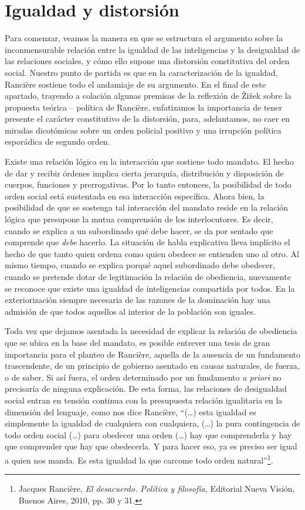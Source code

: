 \section{Igualdad y distorsión}

Para comenzar, veamos la manera en que se estructura el argumento sobre la inconmensurable relación entre la igualdad de las inteligencias y la desigualdad de las relaciones sociales, y cómo ello supone una distorsión constitutiva del orden social. Nuestro punto de partida es que en la caracterización de la igualdad, Rancière sostiene todo el andamiaje de su argumento. En el final de este apartado, trayendo a colación algunas premisas de la reflexión de Žižek sobre la propuesta teórica -- política de Rancière, enfatizamos la importancia de tener presente el carácter constitutivo de la distorsión, para, adelantamos, no caer en miradas dicotómicas sobre un orden policial positivo y una irrupción política esporádica de segundo orden.

Existe una relación lógica en la interacción que sostiene todo mandato. El hecho de dar y recibir órdenes implica cierta jerarquía, distribución y disposición de cuerpos, funciones y prerrogativas. Por lo tanto entonces, la posibilidad de todo orden social está sustentada en esa interacción específica. Ahora bien, la posibilidad de que se sostenga tal interacción del mandato reside en la relación lógica que presupone la mutua comprensión de los interlocutores. Es decir, cuando se explica a un subordinado qué debe hacer, se da por sentado que comprende que \emph{debe} hacerlo. La situación de habla explicativa lleva implícito el hecho de que tanto quien ordena como quien obedece se entienden uno al otro. Al mismo tiempo, cuando se explica porqué aquel subordinado debe obedecer, cuando se pretende dotar de legitimación la relación de obediencia, nuevamente se reconoce que existe una igualdad de inteligencias compartida por todos. En la exteriorización siempre necesaria de las razones de la dominación hay una admisión de que todos aquellos al interior de la población son iguales.

Toda vez que dejamos asentada la necesidad de explicar la relación de obediencia que se ubica en la base del mandato, es posible entrever una tesis de gran importancia para el planteo de Rancière, aquella de la ausencia de un fundamento trascendente, de un principio de gobierno asentado en causas naturales, de fuerza, o de saber. Si así fuera, el orden determinado por un fundamento \emph{a priori} no precisaría de ninguna explicación. De esta forma, las relaciones de desigualdad social entran en tensión continua con la presupuesta relación igualitaria en la dimensión del lenguaje, como nos dice Rancière, \enquote{(\dots) esta igualdad es simplemente la igualdad de cualquiera con cualquiera, (\dots) la pura contingencia de todo orden social (\dots) para obedecer una orden (\dots) hay que comprenderla y hay que comprender que hay que obedecerla. Y para hacer eso, ya es preciso ser igual a quien nos manda. Es esta igualdad la que carcome todo orden natural}\footnote{Jacques Rancière, \emph{El desacuerdo. Política y filosofía,} Editorial Nueva Visión, Buenos Aires, 2010, pp. 30 y 31.}.

